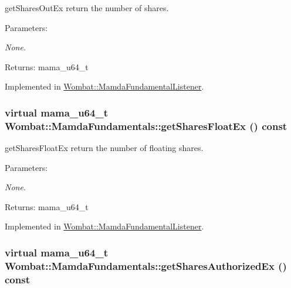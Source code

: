 get\-Shares\-Out\-Ex return the number of shares. 

\begin{Desc}
\item[Parameters:]
\begin{description}
\item[{\em None.}]\end{description}
\end{Desc}
\begin{Desc}
\item[Returns:]mama\_\-u64\_\-t \end{Desc}


Implemented in \hyperlink{classWombat_1_1MamdaFundamentalListener_2dff10a145ad0a1e0b8e3223720eead2}{Wombat::Mamda\-Fundamental\-Listener}.\hypertarget{classWombat_1_1MamdaFundamentals_9fad5ad5bb06171cccd8e9b5a6633793}{
\subsubsection[getSharesFloatEx]{\setlength{\rightskip}{0pt plus 5cm}virtual mama\_\-u64\_\-t Wombat::Mamda\-Fundamentals::get\-Shares\-Float\-Ex () const}}
\label{classWombat_1_1MamdaFundamentals_9fad5ad5bb06171cccd8e9b5a6633793}


get\-Shares\-Float\-Ex return the number of floating shares. 

\begin{Desc}
\item[Parameters:]
\begin{description}
\item[{\em None.}]\end{description}
\end{Desc}
\begin{Desc}
\item[Returns:]mama\_\-u64\_\-t \end{Desc}


Implemented in \hyperlink{classWombat_1_1MamdaFundamentalListener_c37c3fa41884972b67e1abbabeddb9f5}{Wombat::Mamda\-Fundamental\-Listener}.\hypertarget{classWombat_1_1MamdaFundamentals_20aba7aa488e92f4ef85e763ca9264a7}{
\subsubsection[getSharesAuthorizedEx]{\setlength{\rightskip}{0pt plus 5cm}virtual mama\_\-u64\_\-t Wombat::Mamda\-Fundamentals::get\-Shares\-Authorized\-Ex () const}}
\label{classWombat_1_1MamdaFundamentals_20aba7aa488e92f4ef85e763ca9264a7}



